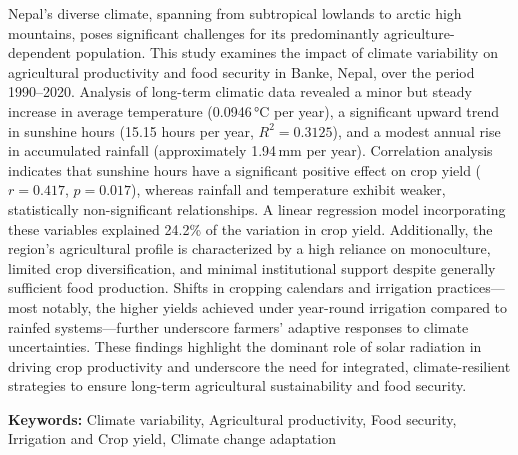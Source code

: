 

Nepal's diverse climate, spanning from subtropical lowlands to arctic high mountains, poses significant challenges for its predominantly agriculture-dependent population. This study examines the impact of climate variability on agricultural productivity and food security in Banke, Nepal, over the period 1990--2020. Analysis of long-term climatic data revealed a minor but steady increase in average temperature (0.0946\,°C per year), a significant upward trend in sunshine hours (15.15 hours per year, $R^2 = 0.3125$), and a modest annual rise in accumulated rainfall (approximately 1.94\,mm per year). Correlation analysis indicates that sunshine hours have a significant positive effect on crop yield ($r = 0.417$, $p = 0.017$), whereas rainfall and temperature exhibit weaker, statistically non-significant relationships. A linear regression model incorporating these variables explained 24.2\% of the variation in crop yield. Additionally, the region’s agricultural profile is characterized by a high reliance on monoculture, limited crop diversification, and minimal institutional support despite generally sufficient food production. Shifts in cropping calendars and irrigation practices—most notably, the higher yields achieved under year-round irrigation compared to rainfed systems—further underscore farmers' adaptive responses to climate uncertainties. These findings highlight the dominant role of solar radiation in driving crop productivity and underscore the need for integrated, climate-resilient strategies to ensure long-term agricultural sustainability and food security.


\noindent \textbf{Keywords:} Climate variability, Agricultural productivity, Food security, Irrigation and Crop yield, Climate change adaptation

